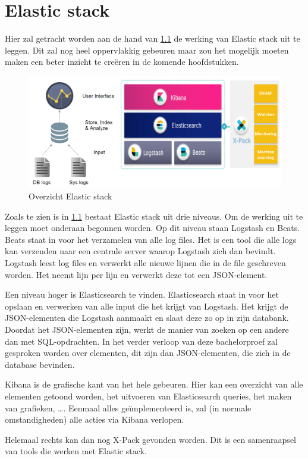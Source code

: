 
\chapter{Elastic stack}
\label{ch:elasticstack}

Hier zal getracht worden aan de hand van \ref{fig:elasticstackoverview} de werking van Elastic stack uit te leggen. Dit zal nog heel oppervlakkig gebeuren maar zou het mogelijk moeten maken een beter inzicht te creëren in de komende hoofdstukken.

\begin{figure}[h]
	\includegraphics[width=16cm]{img/elasticstackoverview}
	\caption{Overzicht Elastic stack}
	\label{fig:elasticstackoverview}
\end{figure}

Zoals te zien is in \ref{fig:elasticstackoverview} bestaat Elastic stack uit drie niveaus. 
Om de werking uit te leggen moet onderaan begonnen worden. Op dit niveau staan Logstash en Beats. 
Beats staat in voor het verzamelen van alle log files. Het is een tool die alle logs kan verzenden naar een centrale server waarop Logstash zich dan bevindt. Logstash leest log files en verwerkt alle nieuwe lijnen die in de file geschreven worden. Het neemt lijn per lijn en verwerkt deze tot een JSON-element.

Een niveau hoger is Elasticsearch te vinden. Elasticsearch staat in voor het opslaan en verwerken van alle input die het krijgt van Logstash. Het krijgt de JSON-elementen die Logstash aanmaakt en slaat deze zo op in zijn databank. Doordat het JSON-elementen zijn, werkt de manier van zoeken op een andere dan met SQL-opdrachten. In het verder verloop van deze bachelorproef zal gesproken worden over elementen, dit zijn dan JSON-elementen, die zich in de database bevinden.

Kibana is de grafische kant van het hele gebeuren. Hier kan een overzicht van alle elementen getoond worden, het uitvoeren van Elasticsearch queries, het maken van grafieken, \dots.
Eenmaal alles geïmplementeerd is, zal (in normale omstandigheden) alle acties via Kibana verlopen.

Helemaal rechts kan dan nog X-Pack gevonden worden. Dit is een samenraapsel van tools die werken met Elastic stack. 
